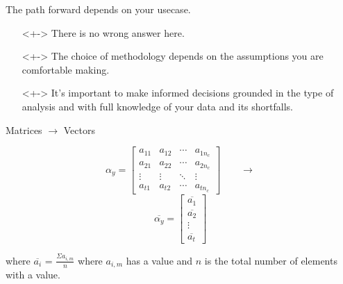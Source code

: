 \documentclass{beamer}
\begin{document}
\begin{frame}{The path forward depends on your usecase.}
  \begin{itemize}
    \item[]<+-> There is no wrong answer here. 
    \item[]<+-> The choice of methodology depends on the assumptions you are comfortable making.
    \item[]<+-> It's important to make informed decisions grounded in the type of analysis and with full knowledge of your data and its shortfalls.
  \end{itemize}
\end{frame}


\begin{frame}{Matrices $\rightarrow$ Vectors}
  \begin{multicols}{2}
    $$
    \alpha_y = \left[\begin{array}{cccc}
    a_{11} & a_{12} & \cdots & a_{1 n_c} \\
    a_{21} & a_{22} & \cdots & a_{2 n_c} \\
    \vdots & \vdots & \ddots & \vdots \\
    a_{t 1} & a_{t 2} & \cdots & a_{t n_c}
    \end{array}\right]
    \qquad\longrightarrow
    $$
    \break
    $$
    \overline{\alpha_y} = \left[\begin{array}{cccc}
    \overline{a_{1}} \\
    \overline{a_{2}} \\
    \vdots \\
    \overline{a_{t}}
    \end{array}\right]
    $$
  \end{multicols}
  where $\overline{a_{i}}$ = $\frac{\Sigma{a_{i, m}}}{n}$ where $a_{i, m}$ has a value and $n$ is the total number of elements with a value.
\end{frame}
\end{document}
